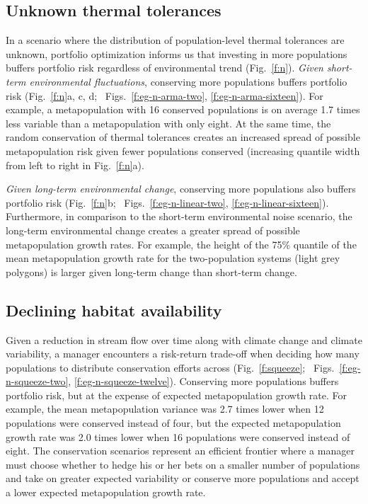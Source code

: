 \subsection{Unknown thermal tolerances}\label{unknown-thermal-tolerances}

In a scenario where the distribution of population-level thermal tolerances are unknown, portfolio optimization informs us that investing in more populations buffers portfolio risk regardless of environmental trend (Fig.~\ref{f:n}). \emph{Given short-term environmental fluctuations}, conserving more populations buffers portfolio risk (Fig.~\ref{f:n}a, c, d; \somts~Figs.~\ref{f:eg-n-arma-two}, \ref{f:eg-n-arma-sixteen}). For example, a metapopulation with 16 conserved populations is on average 1.7 times less variable than a metapopulation with only eight. At the same time, the random conservation of thermal tolerances creates an increased spread of possible metapopulation risk given fewer populations conserved (increasing quantile width from left to right in Fig.~\ref{f:n}a).

\emph{Given long-term environmental change}, conserving more populations also buffers portfolio risk (Fig.~\ref{f:n}b; \somts~Figs.~\ref{f:eg-n-linear-two}, \ref{f:eg-n-linear-sixteen}). Furthermore, in comparison to the short-term environmental noise scenario, the long-term environmental change creates a greater spread of possible metapopulation growth rates. For example, the height of the 75\% quantile of the mean metapopulation growth rate for the two-population systems (light grey polygons) is larger given long-term change than short-term change.

\subsection{Declining habitat availability}\label{declining-habitat-availability}

Given a reduction in stream flow over time along with climate change and climate variability, a manager encounters a risk-return trade-off when deciding how many populations to distribute conservation efforts across (Fig.~\ref{f:squeeze}; \somts~Figs.~\ref{f:eg-n-squeeze-two}, \ref{f:eg-n-squeeze-twelve}). Conserving more populations buffers portfolio risk, but at the expense of expected metapopulation growth rate. For example, the mean metapopulation variance was 2.7 times lower when 12 populations were conserved instead of four, but the expected metapopulation growth rate was 2.0 times lower when 16 populations were conserved instead of eight. The conservation scenarios represent an efficient frontier where a manager must choose whether to hedge his or her bets on a smaller number of populations and take on greater expected variability or conserve more populations and accept a lower expected metapopulation growth rate.

